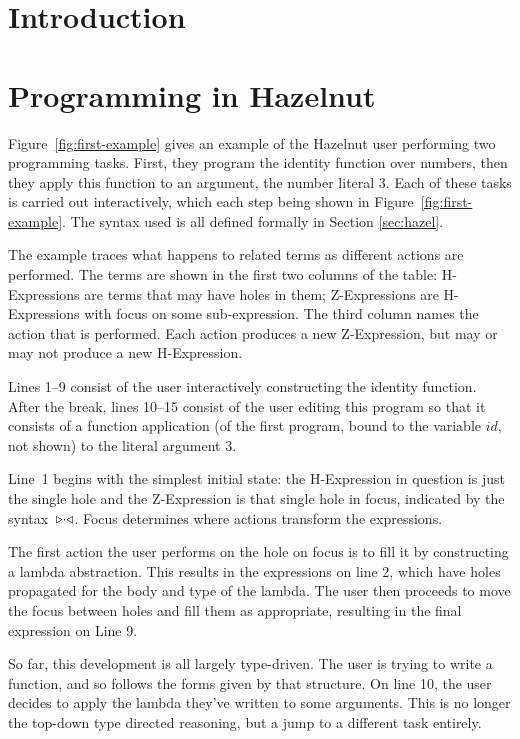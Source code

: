 \documentclass{llncs}
\begin{document}
\section{Introduction}
%


\section{Programming in Hazelnut}
\label{sec:example}
%
Figure~\ref{fig:first-example} gives an example of the Hazelnut user
performing two programming tasks.  First, they program the identity function over numbers, 
then they apply this function to an argument, the number literal $3$. 
Each of these tasks is carried out interactively, which each step being shown in Figure~\ref{fig:first-example}. 
The syntax used is all defined formally in Section \ref{sec:hazel}.

The example traces what happens to related terms as different
actions are performed. The terms are shown in the first two columns of the
table: H-Expressions are terms that may have holes in them; Z-Expressions
are H-Expressions with focus on some sub-expression.
The third column names the action that is performed.
Each action produces a new Z-Expression, but may or may not produce a new H-Expression.

Lines 1--9 consist of the user interactively constructing the identity
function. After the break, lines 10--15 consist of the user editing this
program so that it consists of a function application (of the first
program, bound to the variable $id$, not shown) to the literal argument $3$.

Line~1 begins with the simplest initial state: the H-Expression in question
is just the single hole and the Z-Expression is that single hole in focus,
indicated by the syntax~${\triangleright}{\cdot}{\triangleleft}$. Focus determines where actions
transform the expressions.

The first action the user performs on the hole on focus is to fill it by
constructing a lambda abstraction. This results in the expressions on line
2, which have holes propagated for the body and type of the lambda. The
user then proceeds to move the focus between holes and fill them as
appropriate, resulting in the final expression on Line 9.

So far, this development is all largely type-driven. The user is trying to
write a function, and so follows the forms given by that structure. On line
10, the user decides to apply the lambda they've written to some
arguments. This is no longer the top-down type directed reasoning, but a
jump to a different task entirely.
\end{document}
